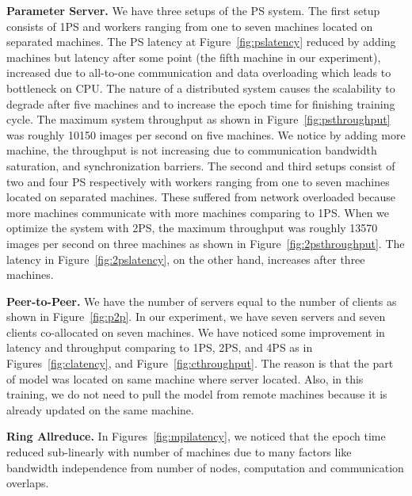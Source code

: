 \documentclass[conference]{IEEEtran}
\begin{document}
\fi
\textbf{Parameter Server.} We have three setups of the PS system. The first setup consists of 1PS and workers ranging from one to seven machines located on separated machines. The PS latency at Figure~\ref{fig:pslatency} reduced by adding machines but latency after some point (the fifth machine in our experiment), increased due to all-to-one communication and data overloading which leads to bottleneck on CPU. The nature of a distributed system causes the scalability to degrade after five machines and to increase the epoch time for finishing training cycle. The maximum system throughput as shown in Figure~\ref{fig:psthroughput} was roughly 10150 images per second on five machines. We notice by adding more machine, the throughput is not increasing due to communication bandwidth saturation, and synchronization barriers. The second and third setups consist of two and four PS respectively with workers ranging from one to seven machines located on separated machines. These suffered from network overloaded because more machines communicate with more machines comparing to 1PS. When we optimize the system with 2PS, the maximum throughput was roughly 13570 images per second on three machines as shown in Figure~\ref{fig:2psthroughput}. The latency in Figure~\ref{fig:2pslatency}, on the other hand, increases after three machines. 

\textbf{Peer-to-Peer.} We have the number of servers equal to the number of clients as shown in Figure~\ref{fig:p2p}. In our experiment, we have seven servers and seven clients co-allocated on seven machines. We have noticed some improvement in latency and throughput comparing to 1PS, 2PS, and 4PS as in Figures~\ref{fig:clatency}, and Figure~\ref{fig:cthroughput}. The reason is that the part of model was located on same machine where server located. Also, in this training, we do not need to pull the model from remote machines because it is already updated on the same machine. 

\textbf{Ring Allreduce.} In Figures~\ref{fig:mpilatency}, we noticed that the epoch time reduced sub-linearly with number of machines due to many factors like bandwidth independence from number of nodes, computation and communication overlaps. 

\iffalse 
\end{document}

